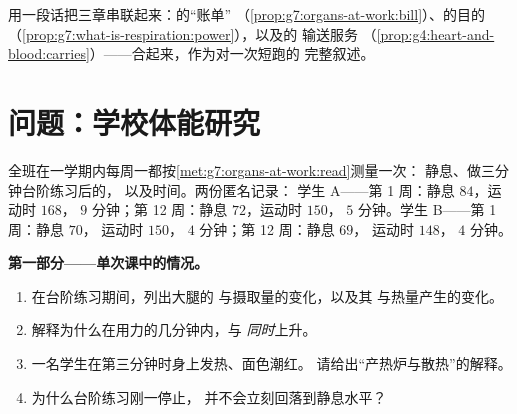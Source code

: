 \begin{exercise}[$\star\star\star$]\label{exo:g7:organs-at-work:12}
用一段话把三章串联起来：的“账单”
（\cref{prop:g7:organs-at-work:bill}）、的目的
（\cref{prop:g7:what-is-respiration:power}），以及的
输送服务
（\cref{prop:g4:heart-and-blood:carries}）——合起来，作为对一次短跑的
完整叙述。
\end{exercise}

\section{问题：学校体能研究}

\begin{problem}\label{pb:g7:organs-at-work:1}
全班在一学期内每周一都按\cref{met:g7:organs-at-work:read}测量一次：
静息、做三分钟台阶练习后的，
以及时间。两份匿名记录：
学生 A——第 1 周：静息 $84$，运动时 $168$，
 $9$ 分钟；第 12 周：静息 $72$，运动时 $150$，
 $5$ 分钟。学生 B——第 1 周：静息 $70$，
运动时 $150$， $4$ 分钟；第 12 周：静息 $69$，
运动时 $148$， $4$ 分钟。

\medskip\noindent\textbf{第一部分——单次课中的情况。}
\begin{enumerate}
  \item 在台阶练习期间，列出大腿的
        与摄取量的变化，以及其
        与热量产生的变化。
  \item 解释为什么在用力的几分钟内，与
        \emph{同时}上升。
  \item 一名学生在第三分钟时身上发热、面色潮红。
        请给出“产热炉与散热”的解释。
  \item 为什么台阶练习刚一停止，
        并不会立刻回落到静息水平？
\end{enumerate}


\end{problem}
